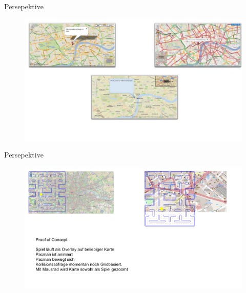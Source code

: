 \documentclass{beamer}
\begin{document}
\begin{frame}{Persepektive}
\begin{figure}[htb]
  \centering
  \includegraphics[scale=0.48]{4.png}
  \label{PNFs}
\end{figure} 
\end{frame}
\begin{frame}{Persepektive}
\begin{figure}[htb]
  \centering
  \includegraphics[scale=0.48]{5.png}
  \label{PNFs}
\end{figure} 
\end{frame}
\end{document}
